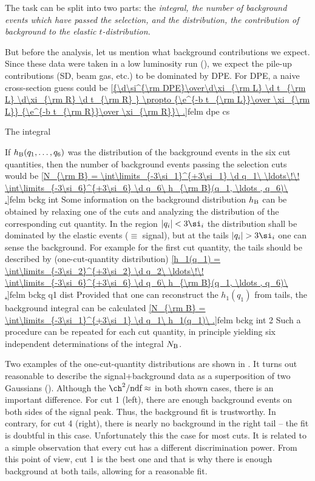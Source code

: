 The task can be split into two parts: the \em{integral}, the number of background events which have passed the selection, and the \em{distribution}, the contribution of background to the elastic $t$-distribution.

But before the analysis, let us mention what background contributions we expect. Since these data were taken in a low luminosity run (), we expect the pile-up contributions (SD, beam gas, etc.) to be dominated by DPE. For DPE, a naive cross-section guess could be 
\eqref{{\d\si^{\rm DPE}\over\d\xi_{\rm L} \d t_{\rm L} \d\xi_{\rm R} \d t_{\rm R} } \propto {\e^{-b t_{\rm L}}\over \xi_{\rm L}} {\e^{-b t_{\rm R}}\over \xi_{\rm R}}\ .}{felm dpe cs}

\caption{The integral}

If $h_{\rm B}(q_1, \ldots , q_6)$ was the distribution of the background events in the six cut quantities, then the number of background events passing the selection cuts would be
\eqref{N_{\rm B} = \int\limits_{-3\si_1}^{+3\si_1} \d q_1\ \ldots\!\! \int\limits_{-3\si_6}^{+3\si_6} \d q_6\  h_{\rm B}(q_1, \ldots , q_6)\ .}{felm bckg int}
Some information on the background distribution $h_{\rm B}$ can be obtained by relaxing one of the cuts and analyzing the distribution of the corresponding cut quantity. In the region $|q_i| < 3\si_i$ the distribution shall be dominated by the elastic events ($\equiv$ signal), but at the tails $|q_i|>3\si_i$ one can sense the background. For example for the first cut quantity, the tails should be described by (one-cut-quantity distribution)
\eqref{h_1(q_1) = \int\limits_{-3\si_2}^{+3\si_2} \d q_2\ \ldots\!\! \int\limits_{-3\si_6}^{+3\si_6} \d q_6\  h_{\rm B}(q_1, \ldots , q_6)\ .}{felm bckg q1 dist}
Provided that one can reconstruct the $h_1(q_1)$ from tails, the background integral can be calculated
\eqref{N_{\rm B} = \int\limits_{-3\si_1}^{+3\si_1} \d q_1\ h_1(q_1)\ .}{felm bckg int 2}
Such a procedure can be repeated for each cut quantity, in principle yielding six independent determinations of the integral $N_{\rm B}$.


Two examples of the one-cut-quantity distributions are shown in . It turns out reasonable to describe the signal+background data as a superposition of two Gaussians (). Although the $\ch^2/\hbox{ndf} \approx$ in both shown cases, there is an important difference. For cut 1 (left), there are enough background events on both sides of the signal peak. Thus, the background fit is trustworthy. In contrary, for cut 4 (right), there is nearly no background in the right tail -- the fit is doubtful in this case. Unfortunately this the case for most cuts. It is related to a simple observation that every cut has a different discrimination power. From this point of view, cut 1 is the best one and that is why there is enough background at both tails, allowing for a reasonable fit.

